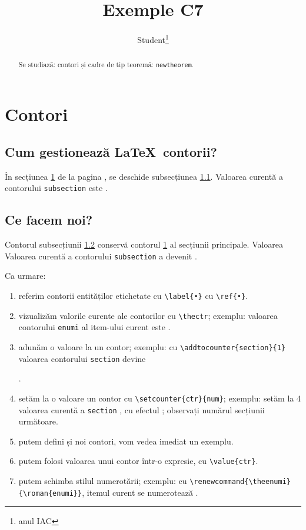 \documentclass{article}
\title{Exemple C7}
\author{Student\footnote{anul IAC}}
\begin{document}
\maketitle
\begin{abstract}
Se studiază: contori și cadre de tip teoremă: \verb+newtheorem+.  
\end{abstract}
\section{Contori}\label{cont}
\subsection{Cum gestionează \LaTeX\ contorii?}\label{intern}
În secțiunea \ref{cont} de la pagina \pageref{cont}, se deschide subsecțiunea \ref{intern}. Valoarea curentă a contorului \verb+subsection+ este \thesubsection.
\subsection{Ce facem noi?}\label{utilizator}
Contorul subsecțiunii \ref{utilizator} conservă contorul \ref{cont} al secțiunii principale. Valoarea Valoarea curentă a contorului \verb+subsection+ a devenit \thesubsection. \par
Ca urmare:
\begin{enumerate}
\item referim contorii entităților etichetate cu \verb+\label{•}+ cu \verb+\ref{•}+.
\item vizualizăm valorile curente ale contorilor cu \verb+\thectr+; exemplu: valoarea contorului \verb+enumi+ al item-ului curent este \theenumi.
\item adunăm o valoare la un contor; exemplu: cu \verb+\addtocounter{section}{1}+ valoarea contorului \verb+section+ devine \addtocounter{section}{1} \thesection.
\item setăm la o valoare un contor cu \verb+\setcounter{ctr}{num}+; exemplu: setăm la 4 valoarea curentă a \verb+section+ \setcounter{section}{4}, cu efectul \thesection; observați numărul  secțiunii următoare.
\item putem defini și noi contori, vom vedea imediat un exemplu.
\item putem folosi valoarea unui contor într-o expresie, cu \verb+\value{ctr}+.
\item putem schimba stilul numerotării; exemplu: cu \verb+\renewcommand{\theenumi}{\roman{enumi}}+, 
\renewcommand{\theenumi}{} itemul curent se numerotează  \theenumi.
\end{enumerate} 
\end{document}
